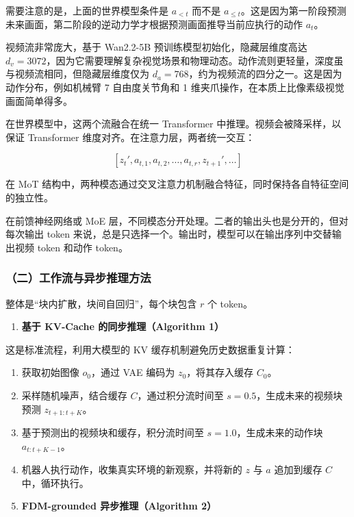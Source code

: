 需要注意的是，上面的世界模型条件是 \(a_{\lt t}\) 而不是 \(a_{\le t}\)。这是因为第一阶段预测未来画面，第二阶段的逆动力学才根据预测画面推导当前应执行的动作 \(a_t\)。

视频流非常庞大，基于 Wan2.2-5B 预训练模型初始化，隐藏层维度高达 \(d_v=3072\)，因为它需要理解复杂视觉场景和物理动态。动作流则更轻量，深度虽与视频流相同，但隐藏层维度仅为 \(d_a=768\)，约为视频流的四分之一。这是因为动作分布，例如机械臂 7 自由度关节角和 1 维夹爪操作，在本质上比像素级视觉画面简单得多。

在世界模型中，这两个流融合在统一 Transformer 中推理。视频会被降采样，以保证 Transformer 维度对齐。在注意力层，两者统一交互：

\[
\left[z_t', a_{t,1}, a_{t,2}, \ldots, a_{t,r}, z_{t+1}', \ldots\right]
\]

在 MoT 结构中，两种模态通过交叉注意力机制融合特征，同时保持各自特征空间的独立性。

在前馈神经网络或 MoE 层，不同模态分开处理。二者的输出头也是分开的，但对每次输出 token 来说，总是只选择一个。输出时，模型可以在输出序列中交替输出视频 token 和动作 token。

\hypertarget{ux4e8cux5de5ux4f5cux6d41ux4e0eux5f02ux6b65ux63a8ux7406ux65b9ux6cd5}{%
\subsubsection{（二）工作流与异步推理方法}\label{ux4e8cux5de5ux4f5cux6d41ux4e0eux5f02ux6b65ux63a8ux7406ux65b9ux6cd5}}

整体是``块内扩散，块间自回归''，每个块包含 \(r\) 个 token。

\begin{enumerate}
\def\labelenumi{\arabic{enumi}.}
\tightlist
\item
  \textbf{基于 KV-Cache 的同步推理（Algorithm 1）}
\end{enumerate}

这是标准流程，利用大模型的 KV 缓存机制避免历史数据重复计算：

\begin{enumerate}
\def\labelenumi{\arabic{enumi}.}
\item
  获取初始图像 \(o_0\)，通过 VAE 编码为 \(z_0\)，将其存入缓存 \(C_0\)。
\item
  采样随机噪声，结合缓存 \(C\)，通过积分流时间至 \(s=0.5\)，生成未来的视频块预测 \(z_{t+1:t+K}\)。
\item
  基于预测出的视频块和缓存，积分流时间至 \(s=1.0\)，生成未来的动作块 \(a_{t:t+K-1}\)。
\item
  机器人执行动作，收集真实环境的新观察，并将新的 \(z\) 与 \(a\) 追加到缓存 \(C\) 中，循环执行。
\item
  \textbf{FDM-grounded 异步推理（Algorithm 2）}
\end{enumerate}

